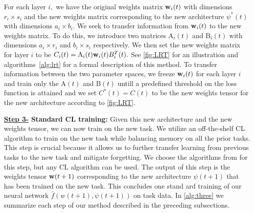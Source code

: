 
For each layer $i,$ we have the original weights matrix $\boldsymbol{\mathrm{w}}_i(t)$ with dimensions $r_i\times s_i$ and the new weights matrix corresponding to the new architecture $\psi^*(t)$ with dimensions $a_i\times b_i.$ We seek to transfer information from $\boldsymbol{\mathrm{w}}_i(t)$ to the new weights matrix. To do this, we introduce two matrices $\mathrm{A}_i(t)$ and $\mathrm{B}_i(t)$ with dimensions $a_i\times r_i$ and $b_i\times s_i$ respectively. We then set the new weights matrix for layer $i$ to be $C_i(t) = \mathrm{A}_i(t)\boldsymbol{\mathrm{w}}_i(t)B^T_i(t).$ See \cref{fig:LRT} for an illustration and algorithms~\ref{alg:lrt} for a formal description of this method. To transfer information between the two parameter spaces, we freeze $\boldsymbol{\mathrm{w}}_i(t)$  for each layer $i$ and train only the $\mathrm{A}(t)$ and $\mathrm{B}(t)$ untill a predefined threshold on the loss function is attained and we set $C^*(t) = C(t)$ to be the new weights tensor for the new architecture according to \cref{fig:LRT}.
 
\textbf{\underline{Step 3-}  Standard CL training:} Given this new architecture and the new weights tensor, we can now train on the new task. We utilize an off-the-shelf CL algorithm to train on the new task while balancing memory on all the prior tasks. This step is crucial because it allows us to further transfer learning from previous tasks to the new task and mitigate forgetting. We choose the algorithms from \cite{raghavan2021formalizing,chakraborty2025understanding} for this step, but any CL algorithm can be used. The output of this step is the weights tensor $\boldsymbol{\mathrm{w}}(t+1)$ corresponding to the new architecture $\psi(t+1)$ that has been trained on the new task. This concludes one stand
 ard training of our neural network $\hat{f}(w(t+1),\psi(t+1))$ on task data. In \cref{alg:three} we summarize each step of our method described in the preceding subsections.
 



